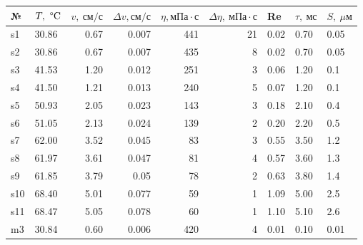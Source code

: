 \documentclass[a4paper, 12pt]{article}
\begin{document}
\begin{table}
    \begin{center}
        \begin{tabular}{|l|l|rr|rr|lll|}
            \hline
            {№} & {$T,\ \text{\textdegree C}$} & {$v,\ \text{см}/\text{с}$} & {$\Delta v, \text{см}/\text{с}$} & {$\eta, \text{мПа} \cdot \text{с}$} & {$\Delta\eta,\ \text{мПа}\cdot\text{с}$} & {Re} & {$\tau,\ \text{мс}$} & {$S,\ \mu\text{м}$} \\
            \hline
            s1  & 30.86           & 0.67        & 0.007              & 441            & 21                   & 0.02 & 0.70         & 0.05        \\
            s2  & 30.86           & 0.67        & 0.007              & 435            & 8                    & 0.02 & 0.70         & 0.05        \\
            s3  & 41.53           & 1.20        & 0.012              & 251            & 3                    & 0.06 & 1.20         & 0.1         \\
            s4  & 41.50           & 1.21        & 0.013              & 240            & 5                    & 0.07 & 1.20         & 0.1         \\
            s5  & 50.93           & 2.05        & 0.023              & 143            & 3                    & 0.18 & 2.10         & 0.4         \\
            s6  & 51.05           & 2.13        & 0.024              & 139            & 2                    & 0.20 & 2.20         & 0.5         \\
            s7  & 62.00           & 3.52        & 0.045              & 83             & 3                    & 0.55 & 3.50         & 1.2         \\
            s8  & 61.97           & 3.61        & 0.047              & 81             & 4                    & 0.57 & 3.60         & 1.3         \\
            s9  & 61.85           & 3.79        & 0.05               & 78             & 2                    & 0.63 & 3.80         & 1.4         \\
            s10 & 68.40           & 5.01        & 0.077              & 59             & 1                    & 1.09 & 5.00         & 2.5         \\
            s11 & 68.47           & 5.05        & 0.078              & 60             & 1                    & 1.10 & 5.10         & 2.6         \\\hline
            m3  & 30.84           & 0.60        & 0.006              & 420            & 4                    & 0.01 & 0.10         & 0.01      \\

\end{tabular}
\end{center}
\end{table}
\end{document}
